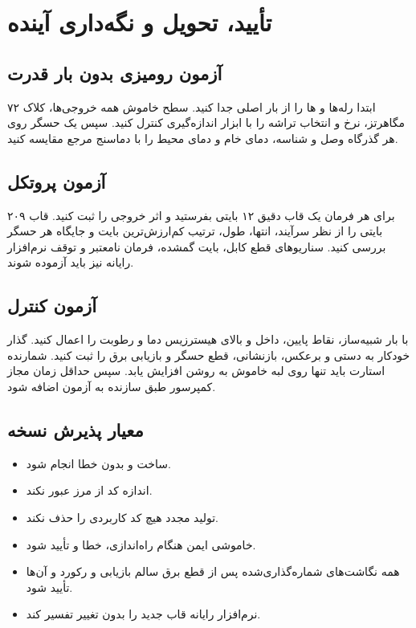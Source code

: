 \chapter{تأیید، تحویل و نگه‌داری آینده}

\section{آزمون رومیزی بدون بار قدرت}
ابتدا رله‌ها و ها را از بار اصلی جدا کنید. سطح خاموش همه خروجی‌ها، کلاک ۷۲ مگاهرتز، نرخ  و انتخاب تراشه  را با ابزار اندازه‌گیری کنترل کنید. سپس یک حسگر روی هر گذرگاه وصل و شناسه، دمای خام و دمای محیط را با دماسنج مرجع مقایسه کنید.

\section{آزمون پروتکل}
برای هر فرمان یک قاب دقیق ۱۲ بایتی بفرستید و اثر خروجی را ثبت کنید. قاب ۲۰۹ بایتی را از نظر سرآیند، انتها، طول، ترتیب کم‌ارزش‌ترین بایت و جایگاه هر حسگر بررسی کنید. سناریوهای قطع کابل، بایت گمشده، فرمان نامعتبر و توقف نرم‌افزار رایانه نیز باید آزموده شوند.

\section{آزمون کنترل}
با بار شبیه‌ساز، نقاط پایین، داخل و بالای هیسترزیس دما و رطوبت را اعمال کنید. گذار خودکار به دستی و برعکس، بازنشانی، قطع حسگر و بازیابی برق را ثبت کنید. شمارنده استارت باید تنها روی لبه خاموش به روشن افزایش یابد. سپس حداقل زمان مجاز کمپرسور طبق سازنده به آزمون اضافه شود.

\section{معیار پذیرش نسخه}
\begin{itemize}
  \item ساخت  و  بدون خطا انجام شود.
  \item اندازه کد از مرز
عبور نکند.
  \item تولید مجدد  هیچ کد کاربردی را حذف نکند.
  \item خاموشی ایمن هنگام راه‌اندازی، خطا و
تأیید شود.
  \item همه نگاشت‌های شماره‌گذاری‌شده پس از قطع برق سالم بازیابی و  رکورد و  آن‌ها تأیید شود.
  \item نرم‌افزار رایانه قاب جدید را بدون تغییر تفسیر کند.
\end{itemize}

